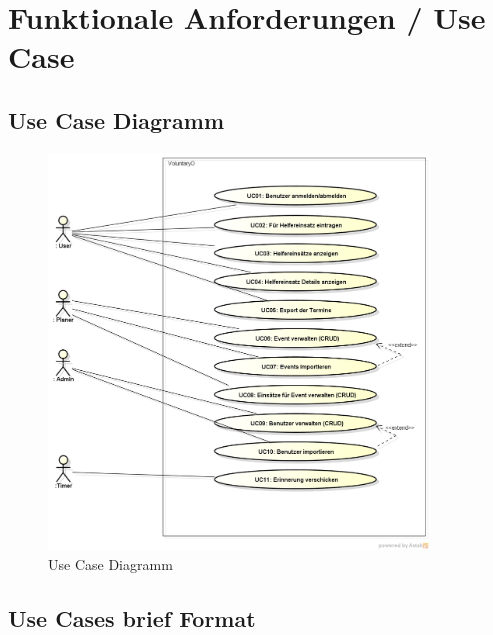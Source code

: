 \chapter{Funktionale Anforderungen / Use Case}

	\section{Use Case Diagramm}    
    \begin{figure}[h]
    	\centering
    	\includegraphics[width=0.9\textwidth]{content/anforderungsspezifikation/images/usecase_diagram.png}
    	\caption{Use Case Diagramm}
	\end{figure}
	
	\section{Use Cases brief Format}
    
